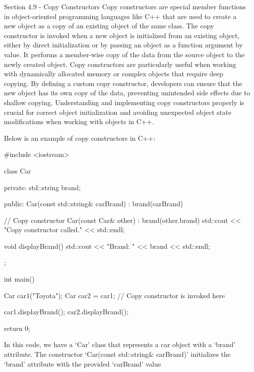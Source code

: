 \begin{notes}{Section 4.9 - Copy Constructors}
    Copy constructors are special member functions in object-oriented programming languages like C++ that are used to create a new object as a copy of an existing object of the same class. The copy constructor is invoked when a new object is initialized from an 
    existing object, either by direct initialization or by passing an object as a function argument by value. It performs a member-wise copy of the data from the source object to the newly created object. Copy constructors are particularly useful when working with 
    dynamically allocated memory or complex objects that require deep copying. By defining a custom copy constructor, developers can ensure that the new object has its own copy of the data, preventing unintended side effects due to shallow copying. Understanding 
    and implementing copy constructors properly is crucial for correct object initialization and avoiding unexpected object state modifications when working with objects in C++.
    
    \begin{highlight}
        Below is an example of copy constructors in C++:
        
    \begin{code}[C++]   
        #include <iostream>
    
    class Car {
    private:
        std::string brand;
    
    public:
        Car(const std::string& carBrand) : brand(carBrand) {}
    
        // Copy constructor
        Car(const Car& other) : brand(other.brand) {
            std::cout << "Copy constructor called." << std::endl;
        }
    
        void displayBrand() {
            std::cout << "Brand: " << brand << std::endl;
        }
    };
    
    int main() {
        Car car1("Toyota");
        Car car2 = car1;  // Copy constructor is invoked here
    
        car1.displayBrand();
        car2.displayBrand();
    
        return 0;
    }
    \end{code}
        In this code, we have a `Car' class that represents a car object with a `brand' attribute. The constructor `Car(const std::string\& carBrand)' initializes the `brand' attribute with the provided `carBrand' value
        

\end{highlight}
\end{notes}
